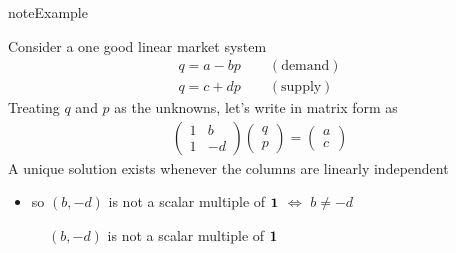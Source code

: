\documentclass[letterpaper,10pt,english]{jupyterBook}
\begin{document}
\begin{sphinxadmonition}{note}{Example}

\sphinxAtStartPar
Consider a one good linear market system
\begin{equation*}
\begin{split}
%
q = a - b p \qquad (\text{demand}) \\
q = c + d p \qquad (\text{supply})
%
\end{split}
\end{equation*}
\sphinxAtStartPar
Treating \(q\) and \(p\) as the unknowns, let’s write in matrix form as
\begin{equation*}
\begin{split}
%
\begin{pmatrix}
1 & b \\
1 & -d
\end{pmatrix}
\begin{pmatrix}
q\\
p
\end{pmatrix}
=
\begin{pmatrix}
a \\
c 
\end{pmatrix}
%
\end{split}
\end{equation*}
\sphinxAtStartPar
A unique solution exists whenever the columns are linearly independent
\begin{itemize}
\item {} 
\sphinxAtStartPar
so \((b, -d)\) is not a scalar multiple of \({\bf 1}\) \(\iff\) \(b \ne -d\)

\end{itemize}
\end{sphinxadmonition}

\begin{figure}[htbp]
\centering
\capstart

\noindent{}
\caption{\((b, -d)\) is not a scalar multiple of \({\bf 1}\)}\label{\detokenize{05.linear_algebra:id14}}\end{figure}
\end{document}
